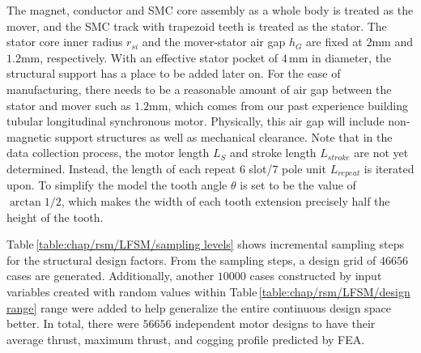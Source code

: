             
            The magnet, conductor and \acs{SMC} core assembly as a whole body is treated as the mover, and the \acs{SMC} track with trapezoid teeth is treated as the stator. The stator core inner radius $r_{si}$ and the mover-stator air gap $h_G$ are fixed at $2\mathrm{mm}$ and $1.2\mathrm{mm}$, respectively. With an effective stator pocket of $4\,\mathrm{mm}$ in diameter, the structural support has a place to be added later on. For the ease of manufacturing, there needs to be a reasonable amount of air gap between the stator and mover such as $1.2\mathrm{mm}$, which comes from our past experience building tubular longitudinal synchronous motor. Physically, this air gap will include non-magnetic support structures as well as mechanical clearance. Note that in the data collection process, the motor length $L_S$ and stroke length $L_{stroke}$ are not yet determined. Instead, the length of each repeat 6 slot/7 pole unit $L_{repeat}$ is iterated upon. To simplify the model the tooth angle $\theta$ is set to be the value of $\arctan{1/2}$, which makes the width of each tooth extension precisely half the height of the tooth.
            
            
            Table\,\ref{table:chap/rsm/LFSM/sampling levels} shows incremental sampling steps for the structural design factors. From the sampling steps, a design grid of $46656$ cases are generated. Additionally, another $10000$ cases constructed by input variables created with random values within Table\,\ref{table:chap/rsm/LFSM/design range} range were added to help generalize the entire continuous design space better. In total, there were $56656$ independent motor designs to have their average thrust, maximum thrust, and cogging profile predicted by \acs{FEA}.
            
